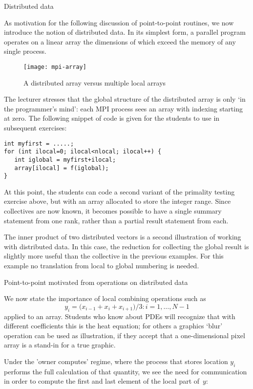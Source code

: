  {Distributed data}

As motivation for the following discussion of point-to-point routines,
we now introduce the notion of distributed data. In its simplest form,
a parallel program operates on a linear array the dimensions of which
exceed the memory of any single process.

\begin{figure*}[ht]
  \texttt{[image: mpi-array]}
  \caption{A distributed array versus multiple local arrays}
  \label{fig:mental-array}
\end{figure*}

The lecturer stresses that the global structure of the distributed
array is only `in the programmer's mind': each MPI process sees an array
with indexing starting at zero. The following snippet of code is given
for the students to use in subsequent exercises:
{\small
\begin{verbatim}
int myfirst = .....;
for (int ilocal=0; ilocal<nlocal; ilocal++) {
   int iglobal = myfirst+ilocal;
   array[ilocal] = f(iglobal);
}  
\end{verbatim}
}

At this point, the students can code a second variant of the primality testing
exercise above, but with an array allocated to store the integer range.
Since collectives are now known, it becomes possible to have a single summary
statement from one rank, rather than a partial result statement from each.

The inner product of two distributed vectors is a second illustration
of working with distributed data. In this case, the reduction for
collecting the global result is slightly more useful than the collective
in the previous examples. For this example no translation from local to global
numbering is needed.

 {Point-to-point motivated from operations on distributed data}

We now state the importance of local combining operations such as
\[ y_i=\bigl( x_{i-1}+x_i+x_{i+1} \bigr)/3\colon i=1,\ldots,N-1 \]
applied to an array. Students who know about \acp{PDE} will recognize
that with different coefficients this is
the heat equation; for others a graphics `blur' operation can be used
as illustration, if they accept that a one-dimensional pixel array is
a stand-in for a true graphic.

Under the 'owner computes' regime, where the process that stores location $y_i$ performs
the full calculation of that quantity, we see the need for communication
in order to compute the first and last element of the local part of~$y$:

